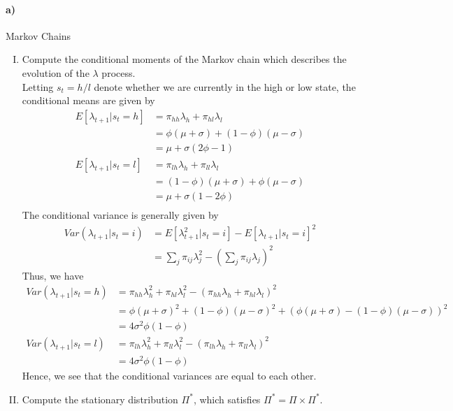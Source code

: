 \documentclass[french]{article}
\begin{document}
\paragraph{a)}Markov Chains
\begin{enumerate}[I.]
	\item Compute the conditional moments of the Markov chain which describes the evolution of the  $\lambda$ process.\\
	
	 Letting $s_t = h/l$ denote whether we are currently in the high or low state, the conditional means are given by
	\begin{equation*}
		\begin{split}
		E\left[\lambda_{t+1}|s_t = h\right] &= \pi_{hh}\lambda_h + \pi_{hl}\lambda_l \\
		&= \phi(\mu + \sigma) + (1-\phi)(\mu-\sigma)\\
		&= \mu + \sigma(2\phi -1)\\
		E\left[\lambda_{t+1}|s_t = l\right]&=\pi_{lh}\lambda_h + \pi_{ll}\lambda_l \\
		&= (1-\phi)(\mu + \sigma) + \phi(\mu-\sigma)\\
		&= \mu +\sigma(1-2\phi)\\
		\end{split}
	\end{equation*}
	The conditional variance is generally given by 
	\begin{equation*}
	\begin{split}
		Var(\lambda_{t+1}|s_t=i)&=E\left[\lambda_{t+1}^2|s_t = i\right] - E\left[\lambda_{t+1}|s_t = i\right]^2\\
		&= \sum_j \pi_{ij} \lambda_j^2 - \left(\sum_j \pi_{ij}\lambda_j\right)^2
	\end{split}
	\end{equation*}
	Thus, we have 
	\begin{equation*}
	\begin{split}
		Var(\lambda_{t+1}|s_t = h) &= \pi_{hh}\lambda_h^2 + \pi_{hl}\lambda_l^2 - (\pi_{hh}\lambda_h + \pi_{hl}\lambda_l)^2\\
		&= \phi(\mu + \sigma)^2 + (1-\phi)(\mu-\sigma)^2 + (\phi(\mu + \sigma) - (1-\phi)(\mu-\sigma))^2\\
		&= 4 \sigma ^2 \phi(1-\phi) \\
		Var(\lambda_{t+1}|s_t = l) &=\pi_{lh}\lambda_h^2 + \pi_{ll}\lambda_l^2 - (\pi_{lh}\lambda_h + \pi_{ll}\lambda_l)^2\\
		&= 4 \sigma ^2 \phi(1-\phi) 
	\end{split}
	\end{equation*}
	Hence, we see that the conditional variances are equal to each other. 
	\item Compute the stationary distribution $\Pi^*$, which satisfies $\Pi^* = \Pi \times \Pi^*$. \\
	

\end{enumerate}
\end{document}
